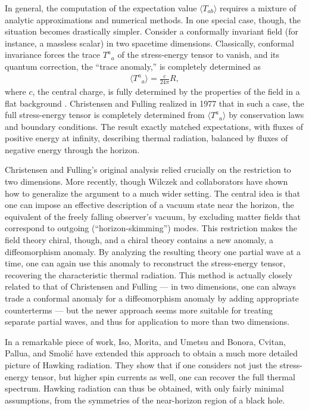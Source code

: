 \documentclass[11pt]{article}
\begin{document}
In general, the computation of  the expectation value $\langle T_{ab}\rangle$
requires a mixture of analytic approximations and numerical methods.  
In one special case, though, the situation becomes drastically simpler.  
Consider a conformally invariant field (for instance, a massless scalar)
in two spacetime dimensions.  Classically, conformal invariance forces
the trace $T^a{}_a$ of the stress-energy tensor to vanish, and its quantum 
correction, the ``trace anomaly,'' is completely determined as
\begin{align*}
\langle T^a{}_a\rangle = \frac{c}{24\pi} R  ,
\end{align*}
where $c$, the central charge, is fully determined by the properties of the 
field in a flat background \cite{FMS}.  Christensen and Fulling \cite{Christensen}  
realized in 1977 that in such a case, the full stress-energy tensor  is 
completely determined  from $\langle T^a{}_a\rangle$ by conservation 
laws and boundary conditions.   The result exactly matched expectations,
with fluxes of positive energy at infinity, describing thermal radiation, 
balanced by fluxes of negative energy through the horizon.

Christensen and Fulling's original analysis relied crucially on the
restriction to two dimensions.  More recently, though Wilczek and   
collaborators \cite{Robinson,Iso,Umetsu} have shown how to generalize
the argument to a much wider setting.  The central idea is that one can
impose an effective description of a vacuum state near the horizon,
the equivalent of the freely falling observer's vacuum, by excluding
matter fields that correspond to outgoing (``horizon-skimming'') modes.  
This restriction makes the field theory chiral, though, and a chiral theory
contains a new anomaly, a diffeomorphism anomaly.  By analyzing the 
resulting theory one partial wave at a time, one can again use this anomaly 
to reconstruct the stress-energy tensor, recovering the characteristic 
thermal radiation.  This method is actually closely related to that
of Christensen and Fulling
--- in two dimensions, one can always trade a conformal anomaly for a 
diffeomorphism anomaly by adding appropriate counter\-terms --- but
the newer approach seems more suitable for treating separate partial
waves, and thus for application to more than two dimensions.

In a remarkable piece of work, Iso, Morita, and Umetsu \cite{IMU}
and Bonora, Cvitan, Pallua, and Smoli{\'c} \cite{BCa,BCb}  have
extended this approach to obtain a much more detailed
picture of Hawking radiation. They show that if one considers not
 just the stress-energy tensor, but higher spin currents as well, 
one can recover the full thermal spectrum.
Hawking radiation can thus be obtained, with only
fairly minimal assumptions, from the symmetries of the near-horizon 
region of a black hole.
\end{document}

